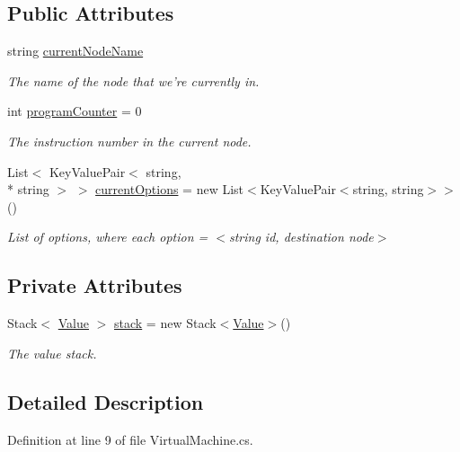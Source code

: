 \subsection*{Public Attributes}
\begin{DoxyCompactItemize}
\item 
string \hyperlink{a00155_a86f481fad527f719b49f8fee6ff79764}{current\-Node\-Name}
\begin{DoxyCompactList}\small\item\em The name of the node that we're currently in. \end{DoxyCompactList}\item 
int \hyperlink{a00155_a2c76546b54b4fb573d7f14d79ce230a3}{program\-Counter} = 0
\begin{DoxyCompactList}\small\item\em The instruction number in the current node. \end{DoxyCompactList}\item 
List$<$ Key\-Value\-Pair$<$ string, \\*
string $>$ $>$ \hyperlink{a00155_ab816dfea32ecda23282700f01454e0a9}{current\-Options} = new List$<$Key\-Value\-Pair$<$string, string$>$$>$()
\begin{DoxyCompactList}\small\item\em List of options, where each option = $<$string id, destination node$>$ \end{DoxyCompactList}\end{DoxyCompactItemize}
\subsection*{Private Attributes}
\begin{DoxyCompactItemize}
\item 
Stack$<$ \hyperlink{a00177}{Value} $>$ \hyperlink{a00155_a0bc84abf38b3ff31cbb47363b851c233}{stack} = new Stack$<$\hyperlink{a00177}{Value}$>$()
\begin{DoxyCompactList}\small\item\em The value stack. \end{DoxyCompactList}\end{DoxyCompactItemize}


\subsection{Detailed Description}


Definition at line 9 of file Virtual\-Machine.\-cs.



